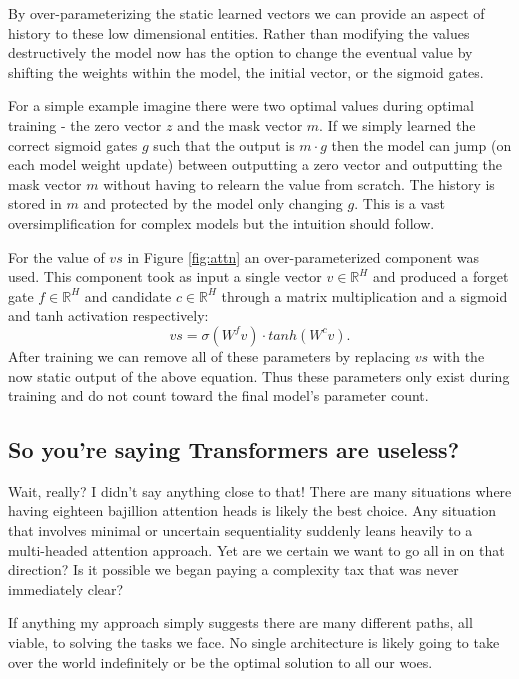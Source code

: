 \documentclass{article}
\begin{document}
By over-parameterizing the static learned vectors we can provide an aspect of history to these low dimensional entities.
Rather than modifying the values destructively the model now has the option to change the eventual value by shifting the weights within the model, the initial vector, or the sigmoid gates.

For a simple example imagine there were two optimal values during optimal training - the zero vector $z$ and the mask vector $m$.
If we simply learned the correct sigmoid gates $g$ such that the output is $m \cdot g$ then the model can jump (on each model weight update) between outputting a zero vector and outputting the mask vector $m$ without having to relearn the value from scratch.
The history is stored in $m$ and protected by the model only changing $g$.
This is a vast oversimplification for complex models but the intuition should follow.

For the value of $vs$ in Figure \ref{fig:attn} an over-parameterized component was used.
This component took as input a single vector $v \in \mathbb{R}^H$ and produced a forget gate $f \in \mathbb{R}^H$ and candidate $c \in \mathbb{R}^H$ through a matrix multiplication and a sigmoid and tanh activation respectively:
$$vs = \sigma(W^f v) \cdot tanh(W^c v).$$
After training we can remove all of these parameters by replacing $vs$ with the now static output of the above equation.
Thus these parameters only exist during training and do not count toward the final model's parameter count.







\subsection{So you're saying Transformers are useless?}

Wait, really?
I didn't say anything close to that!
There are many situations where having eighteen bajillion attention heads is likely the best choice.
Any situation that involves minimal or uncertain sequentiality suddenly leans heavily to a multi-headed attention approach.
Yet are we certain we want to go all in on that direction?
Is it possible we began paying a complexity tax that was never immediately clear?

If anything my approach simply suggests there are many different paths, all viable, to solving the tasks we face.
No single architecture is likely going to take over the world indefinitely or be the optimal solution to all our woes.
\end{document}
